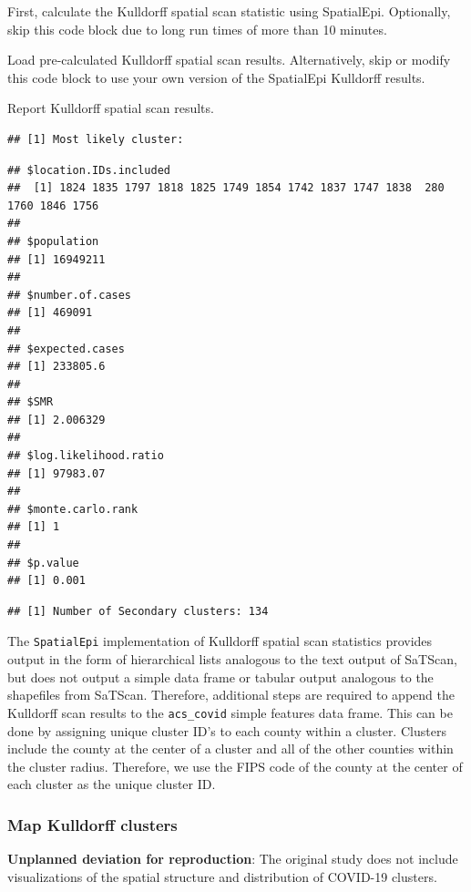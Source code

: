\documentclass[
]{article}
\begin{document}
First, calculate the Kulldorff spatial scan statistic using SpatialEpi.
Optionally, skip this code block due to long run times of more than 10
minutes.

Load pre-calculated Kulldorff spatial scan results. Alternatively, skip
or modify this code block to use your own version of the SpatialEpi
Kulldorff results.

Report Kulldorff spatial scan results.

\begin{verbatim}
## [1] Most likely cluster:
\end{verbatim}

\begin{verbatim}
## $location.IDs.included
##  [1] 1824 1835 1797 1818 1825 1749 1854 1742 1837 1747 1838  280 1760 1846 1756
## 
## $population
## [1] 16949211
## 
## $number.of.cases
## [1] 469091
## 
## $expected.cases
## [1] 233805.6
## 
## $SMR
## [1] 2.006329
## 
## $log.likelihood.ratio
## [1] 97983.07
## 
## $monte.carlo.rank
## [1] 1
## 
## $p.value
## [1] 0.001
\end{verbatim}

\begin{verbatim}
## [1] Number of Secondary clusters: 134
\end{verbatim}

The \texttt{SpatialEpi} implementation of Kulldorff spatial scan
statistics provides output in the form of hierarchical lists analogous
to the text output of SaTScan, but does not output a simple data frame
or tabular output analogous to the shapefiles from SaTScan. Therefore,
additional steps are required to append the Kulldorff scan results to
the \texttt{acs\_covid} simple features data frame. This can be done by
assigning unique cluster ID's to each county within a cluster. Clusters
include the county at the center of a cluster and all of the other
counties within the cluster radius. Therefore, we use the FIPS code of
the county at the center of each cluster as the unique cluster ID.

\hypertarget{map-kulldorff-clusters}{%
\subsubsection{Map Kulldorff clusters}\label{map-kulldorff-clusters}}

\textbf{Unplanned deviation for reproduction}: The original study does
not include visualizations of the spatial structure and distribution of
COVID-19 clusters.
\end{document}
